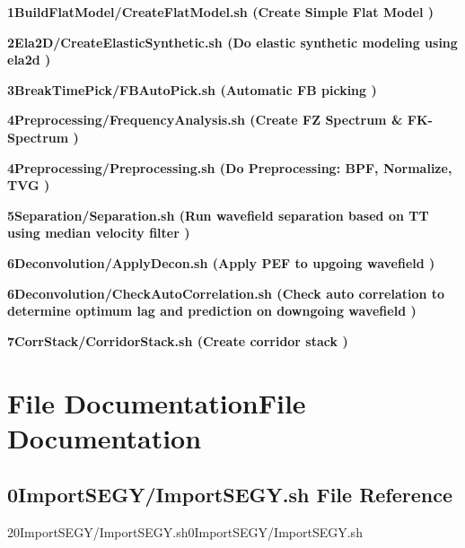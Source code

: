 \documentclass{article}
\begin{document}
\vspace{1pt}
\textbf{1BuildFlatModel/CreateFlatModel.sh (Create Simple Flat Model )}  \pageref{AAAAAAAAAC}

\vspace{1pt}
\textbf{2Ela2D/CreateElasticSynthetic.sh (Do elastic synthetic modeling using ela2d 
)}  \pageref{AAAAAAAAAE}

\vspace{1pt}
\textbf{3BreakTimePick/FBAutoPick.sh (Automatic FB picking )}  \pageref{AAAAAAAAAI}

\vspace{1pt}
\textbf{4Preprocessing/FrequencyAnalysis.sh (Create FZ Spectrum \& FK-Spectrum 
)}  \pageref{AAAAAAAAAJ}

\vspace{1pt}
\textbf{4Preprocessing/Preprocessing.sh (Do Preprocessing: BPF, Normalize, TVG 
)}  \pageref{AAAAAAAAAK}

\vspace{1pt}
\textbf{5Separation/Separation.sh (Run wavefield separation based on TT using median 
velocity filter )}  \pageref{AAAAAAAAAM}

\vspace{1pt}
\textbf{6Deconvolution/ApplyDecon.sh (Apply PEF to upgoing wavefield )}  \pageref{AAAAAAAAAN}

\vspace{1pt}
\textbf{6Deconvolution/CheckAutoCorrelation.sh (Check auto correlation to determine 
optimum lag and prediction on downgoing wavefield )}  \pageref{AAAAAAAAAO}

\vspace{1pt}
\textbf{7CorrStack/CorridorStack.sh (Create corridor stack )}  \pageref{AAAAAAAAAP}\newpage

\newpage
\vspace{24pt}
\section*{{\LARGE{}\textbf{File DocumentationFile Documentation}}}

\vspace{12pt}
\subsection*{{\large{}\textbf{0ImportSEGY/ImportSEGY.sh File Reference}}}

\vspace{12pt}
\leftskip=0pt
20ImportSEGY/ImportSEGY.sh0ImportSEGY/ImportSEGY.sh\label{AAAAAAAAAB}
\end{document}
